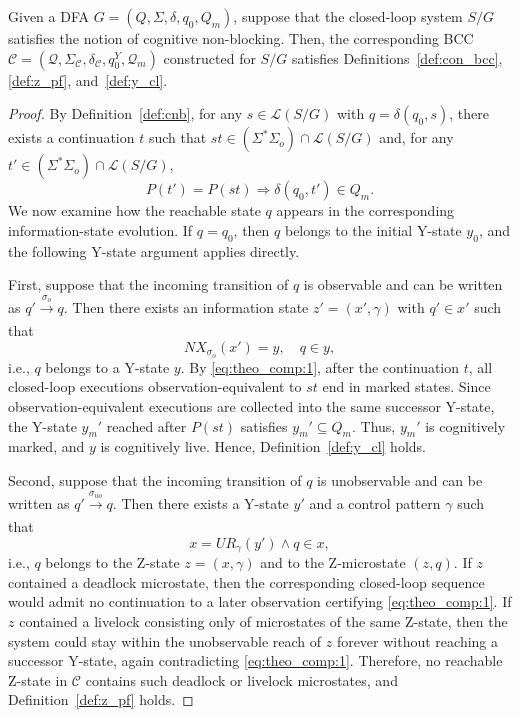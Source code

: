 \documentclass[journal,twoside,web]{ieeecolor}
\begin{document}
\begin{theorem}\label{theo:cnb_complete}
Given a DFA $G = (Q, \Sigma, \delta, q_0, Q_m)$, suppose that the closed-loop system $S / G$ satisfies the notion of cognitive non-blocking.
Then, the corresponding BCC
$
{\mathcal{C}} = ({\bm{\mathcal Q}},\Sigma_{\mathcal{C}},
\delta_{\mathcal{C}}, q^Y_0, \bm{\mathcal{Q}}_m)
$
constructed for $S / G$ satisfies Definitions~\ref{def:con_bcc},
\ref{def:z_pf}, and~\ref{def:y_cl}.
\end{theorem}

\begin{proof}
By Definition~\ref{def:cnb}, for any $s \in \mathcal{L}(S / G)$ with $q = \delta(q_0, s)$, there exists a continuation $t$ such that $st \in (\Sigma^*\Sigma_o) \cap \mathcal{L}(S / G)$ and, for any $t' \in (\Sigma^*\Sigma_o) \cap \mathcal{L}(S / G)$,
\begin{equation}\label{eq:theo_comp:1}
    P(t') = P(st) \Rightarrow \delta(q_0, t') \in Q_m.
\end{equation}
%
We now examine how the reachable state $q$ appears in the corresponding information-state evolution. If $q=q_0$, then $q$ belongs to the initial Y-state $y_0$, and the following Y-state argument applies directly.

First, suppose that the incoming transition of $q$ is observable and can be written as $q' \xrightarrow[]{\sigma_o} q$. Then there exists an information state $z' = (x', \gamma)$ with $q' \in x'$ such that
$$
NX_{\sigma_o}(x') = y, \quad q \in y,
$$
i.e., $q$ belongs to a Y-state $y$.
%
By \eqref{eq:theo_comp:1}, after the continuation $t$, all closed-loop executions observation-equivalent to $st$ end in marked states. Since observation-equivalent executions are collected into the same successor Y-state, the Y-state $y_m'$ reached after $P(st)$ satisfies
$
y_m' \subseteq Q_m.
$
Thus, $y_m'$ is cognitively marked, and $y$ is cognitively live.
Hence, Definition~\ref{def:y_cl} holds.

Second, suppose that the incoming transition of $q$ is unobservable and can be written as $q' \xrightarrow[]{\sigma_{uo}} q$. Then there exists a Y-state $y'$ and a control pattern $\gamma$ such that
$$
x = UR_{\gamma}(y') \wedge q \in x,
$$
i.e., $q$ belongs to the Z-state $z = (x, \gamma)$ and to the Z-microstate $(z,q)$.
%
If $z$ contained a deadlock microstate, then the corresponding closed-loop sequence would admit no continuation to a later observation certifying \eqref{eq:theo_comp:1}. If $z$ contained a livelock consisting only of microstates of the same Z-state, then the system could stay within the unobservable reach of $z$ forever without reaching a successor Y-state, again contradicting \eqref{eq:theo_comp:1}. Therefore, no reachable Z-state in $\mathcal C$ contains such deadlock or livelock microstates, and Definition~\ref{def:z_pf} holds.


\end{proof}
\end{document}
